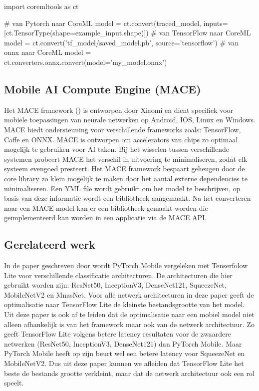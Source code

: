 \begin{python}
import coremltools as ct

# van Pytorch naar CoreML
model = ct.convert(traced_model, inputs=[ct.TensorType(shape=example_input.shape)])
# van TensorFlow naar CoreML
model = ct.convert('tf_model/saved_model.pb', source='tensorflow')
# van onnx naar CoreML
model  = ct.converters.onnx.convert(model='my_model.onnx')
\end{python}

\subsection{Mobile AI Compute Engine (MACE)}
Het MACE framework (\cite{khan_mace_2020}) is ontworpen door Xiaomi en dient specifiek voor mobiele toepassingen van neurale netwerken op Android, IOS, Linux en Windows.
MACE biedt ondersteuning voor verschillende frameworks zoals: TensorFlow, Caffe en ONNX.
MACE is ontworpen om accelerators van chips zo optimaal mogelijk te gebruiken voor AI taken.
Bij het wisselen tussen verschillende systemen probeert MACE het verschil in uitvoering te minimaliseren, zodat elk systeem evengoed presteert.
Het MACE framework bespaart geheugen door de core library zo klein mogelijk te maken door het aantal externe dependencies te minimaliseren.
Een YML file wordt gebruikt om het model te beschrijven, op basis van deze informatie wordt een bibliotheek aangemaakt.
Na het converteren naar een MACE model kan er een bibliotheek gemaakt worden die ge\"implementeerd kan worden in een applicatie via de MACE API.


\subsection{Gerelateerd werk}
In de paper geschreven door \cite{luo_comparison_2020} wordt PyTorch Mobile vergeleken met Tenserfolow Lite voor verschillende classificatie architecturen.
De architecturen die hier gebruikt worden zijn: ResNet50, InceptionV3, DenseNet121, SqueezeNet, MobileNetV2 en MnasNet.
Voor alle netwerk architecturen in deze paper geeft de optimalisatie naar TensorFlow Lite de kleinste bestandsgrootte van het model. 
Uit deze paper is ook af te leiden dat de optimalisatie naar een mobiel model niet alleen afhankelijk is van het framework maar ook van de netwerk architectuur.
Zo geeft TensorFlow Lite volgens \cite{luo_comparison_2020} betere latency resultaten voor de zwaardere netwerken (ResNet50, InceptionV3, DenseNet121) dan PyTorch Mobile.
Maar PyTorch Mobile heeft op zijn beurt wel een betere latency voor SqueezeNet en MobileNetV2.
Dus uit deze paper kunnen we afleiden dat TensorFlow Lite het beste de bestands grootte verkleint, maar dat de netwerk architectuur ook een rol speelt.

